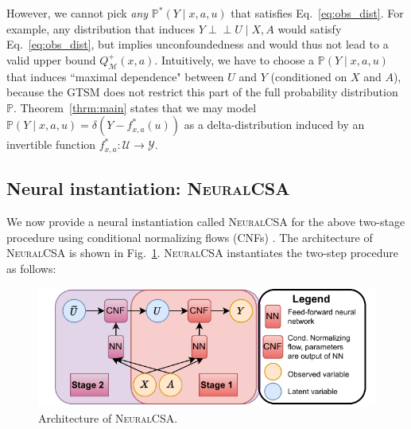 \documentclass{article} %
\newcommand{\indep}{\perp \!\!\! \perp}
\newcommand{\frameworkname}{\textsc{NeuralCSA}\xspace}
\theoremstyle{definition}
\theoremstyle{plain}
\begin{document}
However, we cannot pick \emph{any} $\mathbb{P}^\ast(Y \mid x, a, u)$ that satisfies Eq.~\eqref{eq:obs_dist}. For example, any distribution that induces $Y \indep U \mid X, A$ would satisfy Eq.~\eqref{eq:obs_dist}, but implies unconfoundedness and would thus not lead to a valid upper bound $Q^+_\mathcal{M}(x, a)$. Intuitively, we have to choose a $\mathbb{P}(Y \mid x, a, u)$ that induces ``maximal dependence" between $U$ and $Y$ (conditioned on $X$ and $A$), because the GTSM does not restrict this part of the full probability distribution $\mathbb{P}$. Theorem~\ref{thrm:main} states that we may model $\mathbb{P}(Y \mid x, a, u) = \delta(Y - f^\ast_{x, a}(u))$ as a delta-distribution induced by an invertible function $f^\ast_{x, a} \colon \mathcal{U} \to \mathcal{Y}$.


\subsection{Neural instantiation: \frameworkname}\label{sec:neural}

We now provide a neural instantiation called \frameworkname for the above two-stage procedure using conditional normalizing flows (CNFs) \citep{Winkler.2019}. The architecture of \frameworkname is shown in Fig.~\ref{fig:architecture}. \frameworkname instantiates the two-step procedure as follows:
\begin{figure}
 \centering
 \begin{center}
 \includegraphics[width=1\linewidth]{figures/architecture.pdf}
 \end{center}
 \vspace{-0.4cm}
\caption{Architecture of \frameworkname.}
\label{fig:architecture}
 \vspace{-0.8cm}
\end{figure}
\end{document}
